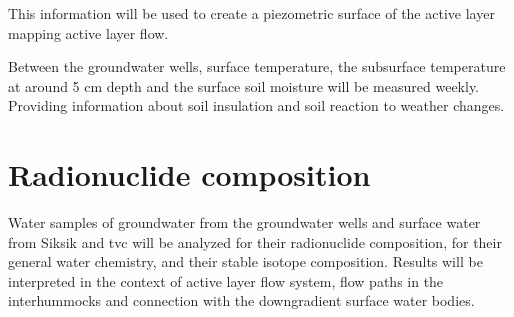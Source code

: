 This information will be used to create a piezometric surface of the active layer mapping active layer flow.

Between the groundwater wells, surface temperature, the subsurface temperature at around 5 cm depth and the surface soil moisture will be measured weekly. 
Providing information about soil insulation and soil reaction to weather changes.
\section{Radionuclide composition}
Water samples of groundwater from the groundwater wells and surface water from Siksik and \gls{tvc} will be analyzed for their radionuclide composition, for their general water chemistry, and their stable isotope composition. 
Results will be interpreted in the context of active layer flow system, flow paths in the interhummocks and connection with the downgradient surface water bodies. 
